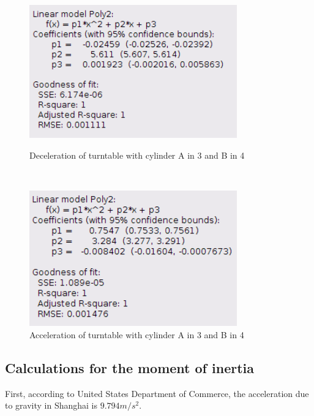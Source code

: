     \begin{figure}[H]
    \centering
    \begin{minipage}{0.45\textwidth}
        \includegraphics[width=0.8\textwidth]{images/51info}
        \caption{Deceleration of turntable with cylinder A in 3 and B in 4}\label{51info}
    \end{minipage}
    ~
    \begin{minipage}{0.45\textwidth}
        \includegraphics[width=0.8\textwidth]{images/52info}
        \caption{Acceleration of turntable with cylinder A in 3 and B in 4}\label{52info}
    \end{minipage}
    \end{figure}

\subsection{Calculations for the moment of inertia}
    First, according to  United States Department of Commerce, the acceleration due to gravity in Shanghai is $9.794m/s^2$.

